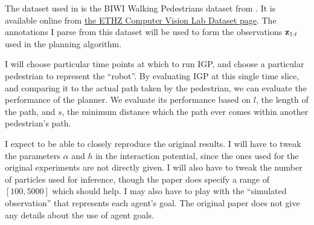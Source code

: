 \documentclass[a4paper,11pt,headings=small]{article}
\begin{document}
The dataset used in \cite{Trautman2010} is the BIWI Walking Pedestrians dataset from \cite{Pellegrini2009}. It is available online from \href{http://www.vision.ee.ethz.ch/datasets/index.en.html}{the ETHZ Computer Vision Lab Dataset page}. The annotations I parse from this dataset will be used to form the observations $\mathbf{z}_{1:t}$ used in the planning algorithm.

I will choose particular time points at which to run IGP, and choose a particular pedestrian to represent the ``robot''. By evaluating IGP at this single time slice, and comparing it to the actual path taken by the pedestrian, we can evaluate the performance of the planner. We evaluate its performance based on $l$, the length of the path, and $s$, the minimum distance which the path ever comes within another pedestrian's path.

I expect to be able to closely reproduce the original results. I will have to tweak the parameters $\alpha$ and $h$ in the interaction potential, since the ones used for the original experiments are not directly given. I will also have to tweak the number of particles used for inference, though the paper does specify a range of $[100,5000]$ which should help. I may also have to play with the ``simulated observation'' that represents each agent's goal. The original paper does not give any details about the use of agent goals.




\end{document}
